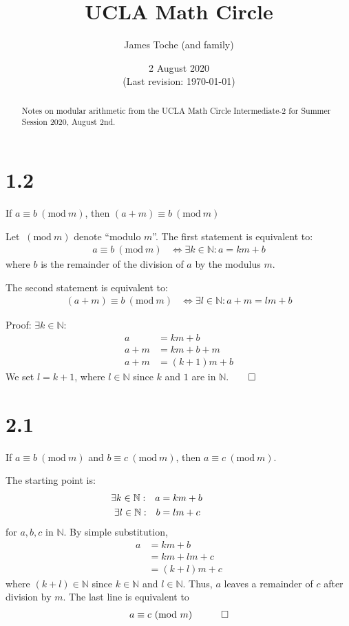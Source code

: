 \documentclass[12pt]{article}
\title{UCLA Math Circle}
\author{James Toche (and family)}
\date{2 August 2020 \\(Last revision: \today)}
\newcommand{\modulo}[1]{~(\mathrm{mod}~#1)}
\begin{document}
\begin{minipage}{\textwidth}
\maketitle
\begin{abstract}
Notes on modular arithmetic from the UCLA Math Circle Intermediate-2 for Summer Session 2020, August 2nd. 
\end{abstract}
\end{minipage}

\newpage
\section*{1.2}
\begin{question}
If $a\equiv b\modulo{m}$, then $(a+m)\equiv b\modulo{m}$
\end{question}

Let $\modulo{m}$ denote ``modulo $m$''.  The first statement is equivalent to: 
\begin{align*}
a\equiv b\modulo{m}
 & \iff
\exists k\in\mathbb{N}: a = km + b
\end{align*}
where $b$ is the remainder of the division of $a$ by the modulus $m$. 

The second statement is equivalent to: 
\begin{align*}
(a+m)\equiv b\modulo{m}
 & \iff
\exists l\in\mathbb{N}: a+m = lm + b
\end{align*}

Proof: $\exists k\in\mathbb{N}$:
\begin{align*}
a 
  & = km + b \\
a + m
  & = km + b + m \\
a + m 
  & = (k+1)m + b
\end{align*}
We set $l=k+1$, where $l\in\mathbb{N}$ since $k$ and $1$ are in $\mathbb{N}$.$\qed$


\clearpage
\section*{2.1}
\begin{question}
If $a\equiv b\modulo{m}$ and $b\equiv c\modulo{m}$, then $a\equiv c\modulo{m}$.
\end{question}

The starting point is:
\begin{align*}
\mathllap{\exists k\in\mathbb{N}:\quad} 
  a & = km + b \\
\mathllap{\exists l\in\mathbb{N}:\quad} 
  b & = lm + c 
\end{align*}
for $a,b,c$ in $\mathbb{N}$. By simple substitution,
\begin{align*}
a & = km + b \\
  & = km + lm + c \\
  & = (k+l)m + c 
\end{align*}
where $(k+l)\in\mathbb{N}$ since $k\in\mathbb{N}$ and $l\in\mathbb{N}$. Thus, $a$ leaves a remainder of $c$ after division by $m$. The last line is equivalent to
\begin{align*}
a\equiv c\modulo{m} \quad \qed
\end{align*}
\end{document}
